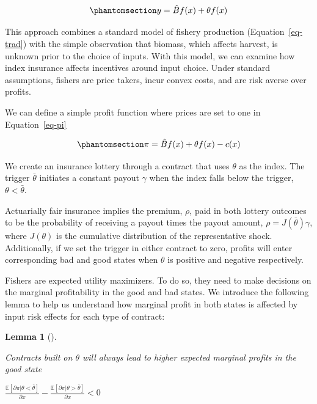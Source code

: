\documentclass[
  letterpaper,
  DIV=11,
  numbers=noendperiod]{scrartcl}
\theoremstyle{plain}
\newtheorem{lemma}{Lemma}[section]
\theoremstyle{plain}
\theoremstyle{remark}
\begin{document}
\begin{equation}\phantomsection\label{eq-trad2}{
    y = \hat{B}f(x) + \theta f(x)
}\end{equation}

This approach combines a standard model of fishery production
(Equation~\ref{eq-trad}) with the simple observation that biomass, which
affects harvest, is unknown prior to the choice of inputs. With this
model, we can examine how index insurance affects incentives around
input choice. Under standard assumptions, fishers are price takers,
incur convex costs, and are risk averse over profits.

We can define a simple profit function where prices are set to one in
Equation~\ref{eq-pi}

\begin{equation}\phantomsection\label{eq-pi}{
\pi=\hat{B}f(x)+\theta f(x)-c(x)
}\end{equation}

We create an insurance lottery through a contract that uses \(\theta\)
as the index. The trigger \(\bar{\theta}\) initiates a constant payout
\(\gamma\) when the index falls below the trigger,
\(\theta<\bar{\theta}\).

Actuarially fair insurance implies the premium, \(\rho\), paid in both
lottery outcomes to be the probability of receiving a payout times the
payout amount, \(\rho=J(\bar \theta)\gamma\), where \(J(\theta)\) is the
cumulative distribution of the representative shock. Additionally, if we
set the trigger in either contract to zero, profits will enter
corresponding bad and good states when \(\theta\) is positive and
negative respectively.

Fishers are expected utility maximizers. To do so, they need to make
decisions on the marginal profitability in the good and bad states. We
introduce the following lemma to help us understand how marginal profit
in both states is affected by input risk effects for each type of
contract:

\begin{lemma}[]\protect\hypertarget{lem-theta}{}\label{lem-theta}

Contracts built on \(\theta\) will always lead to higher expected
marginal profits in the good state

\(\frac{\mathbb{E}[\partial \pi|\theta<\bar \theta]}{\partial x}-\frac{\mathbb{E}[\partial \pi|\theta>\bar \theta]}{\partial x}<0\)

\end{lemma}
\end{document}
